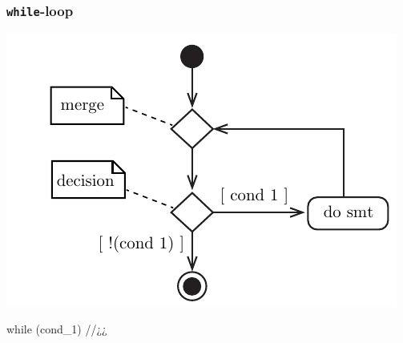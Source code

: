 \subsubsection{\texttt{while}-loop}
\begin{minipage}{.50\textwidth}
\centering
\includegraphics[width=0.80\linewidth]{01_Basics/figures/uml/IterationStatement-00-UML-while.pdf}
\label{fig:ch01_Basics_UML_IterationStatement-00-while}
\end{minipage}
\begin{minipage}{.25\textwidth}
\begin{CPPCode}
while (cond_1)
{
    //¿¿
}
\end{CPPCode}
\end{minipage}
\vspace{0.5cm}

